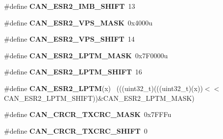 \begin{DoxyCompactItemize}
\item 
\hypertarget{group___c_a_n___register___masks_gac5b6c49733501a621096ab8226acafd0}{}\#define {\bfseries C\+A\+N\+\_\+\+E\+S\+R2\+\_\+\+I\+M\+B\+\_\+\+S\+H\+I\+F\+T}~13\label{group___c_a_n___register___masks_gac5b6c49733501a621096ab8226acafd0}

\item 
\hypertarget{group___c_a_n___register___masks_ga5fc376e62f61a97583edf7a54b8753be}{}\#define {\bfseries C\+A\+N\+\_\+\+E\+S\+R2\+\_\+\+V\+P\+S\+\_\+\+M\+A\+S\+K}~0x4000u\label{group___c_a_n___register___masks_ga5fc376e62f61a97583edf7a54b8753be}

\item 
\hypertarget{group___c_a_n___register___masks_ga7c22b4e9fdd8beae74e86b256db23665}{}\#define {\bfseries C\+A\+N\+\_\+\+E\+S\+R2\+\_\+\+V\+P\+S\+\_\+\+S\+H\+I\+F\+T}~14\label{group___c_a_n___register___masks_ga7c22b4e9fdd8beae74e86b256db23665}

\item 
\hypertarget{group___c_a_n___register___masks_ga864e9e1cd2a2b0e354b284bd5488f29e}{}\#define {\bfseries C\+A\+N\+\_\+\+E\+S\+R2\+\_\+\+L\+P\+T\+M\+\_\+\+M\+A\+S\+K}~0x7\+F0000u\label{group___c_a_n___register___masks_ga864e9e1cd2a2b0e354b284bd5488f29e}

\item 
\hypertarget{group___c_a_n___register___masks_gace1651295c821917bb5b37915baa3771}{}\#define {\bfseries C\+A\+N\+\_\+\+E\+S\+R2\+\_\+\+L\+P\+T\+M\+\_\+\+S\+H\+I\+F\+T}~16\label{group___c_a_n___register___masks_gace1651295c821917bb5b37915baa3771}

\item 
\hypertarget{group___c_a_n___register___masks_gaf5f092143c11fc809fc6a6108828bfe7}{}\#define {\bfseries C\+A\+N\+\_\+\+E\+S\+R2\+\_\+\+L\+P\+T\+M}(x)                                              ~(((uint32\+\_\+t)(((uint32\+\_\+t)(x))$<$$<$C\+A\+N\+\_\+\+E\+S\+R2\+\_\+\+L\+P\+T\+M\+\_\+\+S\+H\+I\+F\+T))\&C\+A\+N\+\_\+\+E\+S\+R2\+\_\+\+L\+P\+T\+M\+\_\+\+M\+A\+S\+K)\label{group___c_a_n___register___masks_gaf5f092143c11fc809fc6a6108828bfe7}

\item 
\hypertarget{group___c_a_n___register___masks_ga84c305cf0ec60d0624b454e280c69c4b}{}\#define {\bfseries C\+A\+N\+\_\+\+C\+R\+C\+R\+\_\+\+T\+X\+C\+R\+C\+\_\+\+M\+A\+S\+K}~0x7\+F\+F\+Fu\label{group___c_a_n___register___masks_ga84c305cf0ec60d0624b454e280c69c4b}

\item 
\hypertarget{group___c_a_n___register___masks_ga56fca714ec47e9786fdf7e9378c660aa}{}\#define {\bfseries C\+A\+N\+\_\+\+C\+R\+C\+R\+\_\+\+T\+X\+C\+R\+C\+\_\+\+S\+H\+I\+F\+T}~0\label{group___c_a_n___register___masks_ga56fca714ec47e9786fdf7e9378c660aa}


\end{DoxyCompactItemize}
